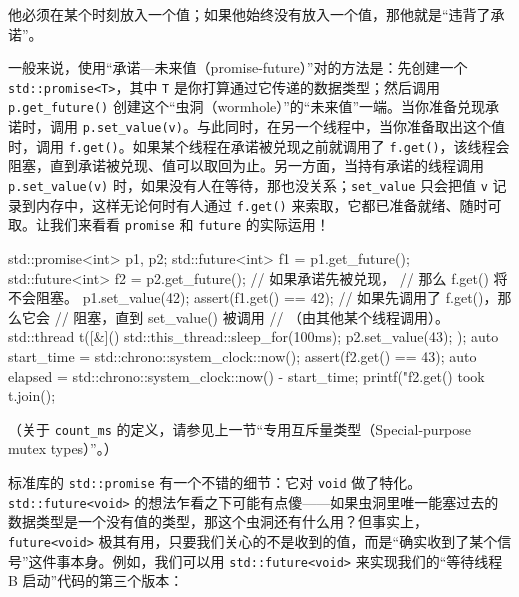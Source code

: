 他必须在某个时刻放入一个值；如果他始终没有放入一个值，那他就是“违背了承诺”。

一般来说，使用“承诺—未来值（promise-future）”对的方法是：先创建一个 \texttt{std::\allowbreak{}promise<\allowbreak{}T>\allowbreak{}}，其中 \texttt{T} 是你打算通过它传递的数据类型；然后调用 \texttt{p.\allowbreak{}get\_\allowbreak{}future(\allowbreak{})\allowbreak{}} 创建这个“虫洞（wormhole）”的“未来值”一端。当你准备兑现承诺时，调用 \texttt{p.\allowbreak{}set\_\allowbreak{}value(\allowbreak{}v)\allowbreak{}}。与此同时，在另一个线程中，当你准备取出这个值时，调用 \texttt{f.\allowbreak{}get(\allowbreak{})\allowbreak{}}。如果某个线程在承诺被兑现之前就调用了 \texttt{f.\allowbreak{}get(\allowbreak{})\allowbreak{}}，该线程会阻塞，直到承诺被兑现、值可以取回为止。另一方面，当持有承诺的线程调用 \texttt{p.\allowbreak{}set\_\allowbreak{}value(\allowbreak{}v)\allowbreak{}} 时，如果没有人在等待，那也没关系；\texttt{set\_\allowbreak{}value} 只会把值 \texttt{v} 记录到内存中，这样无论何时有人通过 \texttt{f.\allowbreak{}get(\allowbreak{})\allowbreak{}} 来索取，它都已准备就绪、随时可取。让我们来看看 \texttt{promise} 和 \texttt{future} 的实际运用！

\begin{codebox}[cpp]
    std::promise<int> p1, p2;
    std::future<int> f1 = p1.get_future();
    std::future<int> f2 = p2.get_future();
      // 如果承诺先被兑现，
      // 那么 f.get() 将不会阻塞。
    p1.set_value(42);
    assert(f1.get() == 42);
      // 如果先调用了 f.get()，那么它会
      // 阻塞，直到 set_value() 被调用
      // （由其他某个线程调用）。
    std::thread t([&](){
      std::this_thread::sleep_for(100ms);
      p2.set_value(43);
    });
    auto start_time = std::chrono::system_clock::now();
    assert(f2.get() == 43);
    auto elapsed = std::chrono::system_clock::now() - start_time;
    printf("f2.get() took %
    t.join();
\end{codebox}

（关于 \texttt{count\_\allowbreak{}ms} 的定义，请参见上一节“专用互斥量类型（Special-purpose mutex types）”。）

标准库的 \texttt{std::\allowbreak{}promise} 有一个不错的细节：它对 \texttt{void} 做了特化。\texttt{std::\allowbreak{}future<\allowbreak{}void>\allowbreak{}} 的想法乍看之下可能有点傻——如果虫洞里唯一能塞过去的数据类型是一个没有值的类型，那这个虫洞还有什么用？但事实上，\texttt{future<\allowbreak{}void>\allowbreak{}} 极其有用，只要我们关心的不是收到的值，而是“确实收到了某个信号”这件事本身。例如，我们可以用 \texttt{std::\allowbreak{}future<\allowbreak{}void>\allowbreak{}} 来实现我们的“等待线程 B 启动”代码的第三个版本：

